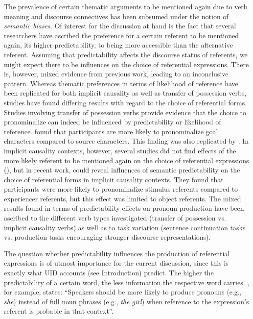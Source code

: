 \documentclass[output=paper,colorlinks,citecolor=brown]{langscibook}
\begin{document}
The prevalence of certain thematic arguments to be mentioned again due to verb meaning and discourse connectives has been subsumed under the notion of \textit{semantic biases}. Of interest for the discussion at hand is the fact that several researchers have ascribed the preference for a certain referent to be mentioned again, its higher predictability, to being more accessible than the alternative referent. 
Assuming that predictability affects the discourse status of referents, we might expect there to be influences on the choice of referential expressions. There is, however, mixed evidence from previous work, leading to an inconclusive pattern. Whereas thematic preferences in terms of likelihood of reference have been replicated for both implicit causality as well as transfer of possession verbs, studies have found differing results with regard to the choice of referential forms.
Studies involving transfer of possession verbs provide evidence that the choice to pronominalize can indeed be influenced by predictability or likelihood of reference. \citet{Arnold-01} found that participants are more likely to pronominalize goal characters compared to source characters. This finding was also replicated by \citet{Rosa::Arnold-17}. In implicit causality contexts, however, several studies did not find effects of the more likely referent to be mentioned again on the choice of referential expressions (\citealt{Stevenson::al-94, Kehler::al-08, Fukumura::van_Gompel-10}), but in recent work, \citet{Weatherford::Arnold-21} could reveal influences of semantic predictability on the choice of referential forms in implicit causality contexts. They found that participants were more likely to pronominalize stimulus referents compared to experiencer referents, but this effect was limited to object referents. 
The mixed results found in terms of predictability effects on pronoun production have been ascribed to the different verb types investigated (transfer of possession vs. implicit causality verbs) as well as to task variation (sentence continuation tasks vs. production tasks encouraging stronger discourse representations).

The question whether predictability influences the production of referential expressions is of utmost importance for the current discussion, since this is exactly what UID accounts (see Introduction) predict. The higher the predictability of a certain word, the less information the respective word carries. \citet[48]{Jaeger-10}, for example, states: \enquote{Speakers should be more likely to produce pronouns (e.g., \textit{she}) instead of full noun phrases (e.g., \textit{the girl}) when reference to the expression's referent is probable in that context}. 
\end{document}
